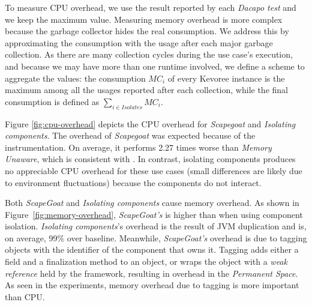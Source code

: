 To measure CPU overhead, we use the result reported by each \textit{Dacapo test} and we keep the maximum value.
Measuring memory overhead is more complex because the garbage collector hides the real consumption.
We address this by approximating the consumption with the usage after each major garbage collection.
As there are many collection cycles during the use case's execution, and because we may have more than one runtime involved, we define a scheme to aggregate the values: the consumption $MC_i$ of every Kevoree instance is the maximum among all the usages reported after each collection, while the final consumption is defined as $\sum_{i \in \mathit{Isolates}} {\textit{MC}}_i$.

Figure \ref{fig:cpu-overhead} depicts the CPU overhead for \textit{Scapegoat} and \textit{Isolating components}.
The overhead of \textit{Scapegoat} was expected because of the instrumentation.
On average, it performs 2.27 times worse than \textit{Memory Unaware}, which is consistent with \cite{gonzalezherrera:hal-00983045}.
In contrast, isolating components produces no appreciable CPU overhead for these use cases (small differences are likely due to environment fluctuations) because the components do not interact.

Both \textit{ScapeGoat} and \textit{Isolating components} cause memory overhead.
As shown in Figure~\ref{fig:memory-overhead}, \textit{ScapeGoat's} is higher than when using component isolation.
\textit{Isolating components}'s overhead is the result of JVM duplication and is, on average, 99\% over baseline.
Meanwhile, \textit{ScapeGoat's} overhead is due to tagging objects with the identifier of the component that owns it.
Tagging adds either a field and a finalization method to an object, or wraps the object with a \textit{weak reference} held by the framework, resulting in overhead in the \textit{Permanent Space}.
As seen in the experiments, memory overhead due to tagging is more important than CPU. 

\begin{figure*}
\centering
\begin{minipage}[t]{0.43\linewidth}
	\centering
	
	\caption{CPU overhead caused by resource management during the execution of Dacapo benchmarks.}\label{fig:cpu-overhead}
\end{minipage}
\hspace{0.05\linewidth}
\begin{minipage}[t]{0.43\linewidth}
	\centering
	
	\caption{Memory overhead caused by resource management during the execution of Dacapo benchmarks.}\label{fig:memory-overhead}
\end{minipage}
\end{figure*}


